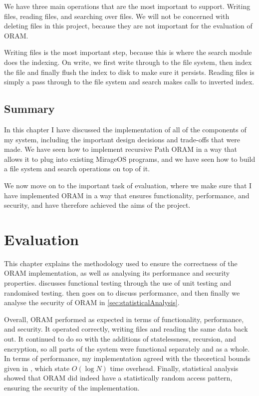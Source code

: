 \documentclass[12pt,a4paper,twoside,openright]{report}
\begin{document}
We have three main operations that are the most important to support. Writing files, reading files, and searching over files. We will not be concerned with deleting files in this project, because they are not important for the evaluation of ORAM. 

Writing files is the most important step, because this is where the search module does the indexing. On write, we first write through to the file system, then index the file and finally flush the index to disk to make sure it persists. Reading files is simply a pass through to the file system and search makes calls to inverted index.

\section{Summary}
\label{sec:implSummary}

In this chapter I have discussed the implementation of all of the components of my system, including the important design decisions and trade-offs that were made. We have seen how to implement recursive Path ORAM in a way that allows it to plug into existing MirageOS programs, and we have seen how to build a file system and search operations on top of it.

We now move on to the important task of evaluation, where we make sure that I have implemented ORAM in a way that ensures functionality, performance, and security, and have therefore achieved the aims of the project.

\chapter{Evaluation}

This chapter explains the methodology used to ensure the correctness of the ORAM implementation, as well as analysing its performance and security properties.  discusses functional testing through the use of unit testing and randomised testing.  then goes on to discuss performance, and then finally we analyse the security of ORAM in \cref{sec:statisticalAnalysis}.

Overall, ORAM performed as expected in terms of functionality, performance, and security. It operated correctly, writing files and reading the same data back out. It continued to do so with the additions of statelessness, recursion, and encryption, so all parts of the system were functional separately and as a whole. In terms of performance, my implementation agreed with the theoretical bounds given in \citet{stefanov2013path}, which state $O(\log N)$ time overhead. Finally, statistical analysis showed that ORAM did indeed have a statistically random access pattern, ensuring the security of the implementation.
\end{document}
